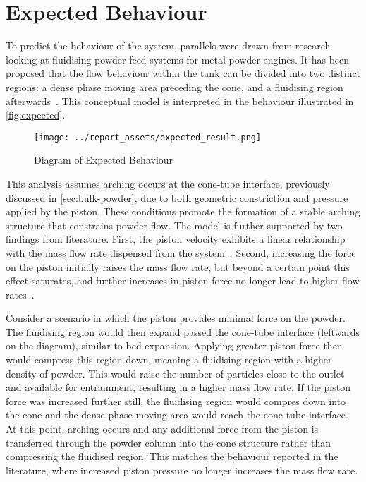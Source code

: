\section{Expected Behaviour}\label{sec:expected-behaviour}
To predict the behaviour of the system, parallels were drawn from research looking at fluidising powder feed systems for metal powder engines. It has been proposed that the flow behaviour within the tank can be divided into two distinct regions: a dense phase moving area preceding the cone, and a fluidising region afterwards~\cite{Tang22}. This conceptual model is interpreted in the behaviour illustrated in \autoref{fig:expected}. 
\begin{figure}[htbp]
    \centering
    
    \begin{minipage}{0.6\textwidth}
        \centering
        \texttt{[image: ../report\_assets/expected\_result.png]}
        \caption{Diagram of Expected Behaviour}\label{fig:expected}
    \end{minipage}
    
\end{figure}
This analysis assumes arching occurs at the cone-tube interface, previously discussed in \autoref{sec:bulk-powder}, due to both geometric constriction and pressure applied by the piston. These conditions promote the formation of a stable arching structure that constrains powder flow. The model is further supported by two findings from literature. First, the piston velocity exhibits a linear relationship with the mass flow rate dispensed from the system~\cite{SUN201630}. Second, increasing the force on the piston initially raises the mass flow rate, but beyond a certain point this effect saturates, and further increases in piston force no longer lead to higher flow rates~\cite{LI2021712}.

Consider a scenario in which the piston provides minimal force on the powder. The fluidising region would then expand passed the cone-tube interface (leftwards on the diagram), similar to bed expansion. Applying greater piston force then would compress this region down, meaning a fluidising region with a higher density of powder. This would raise the number of particles close to the outlet and available for entrainment, resulting in a higher mass flow rate. If the piston force was increased further still, the fluidising region would compres down into the cone and the dense phase moving area would reach the cone-tube interface. At this point, arching occurs and any additional force from the piston is transferred through the powder column into the cone structure rather than compressing the fluidised region. This matches the behaviour reported in the literature, where increased piston pressure no longer increases the mass flow rate. 

